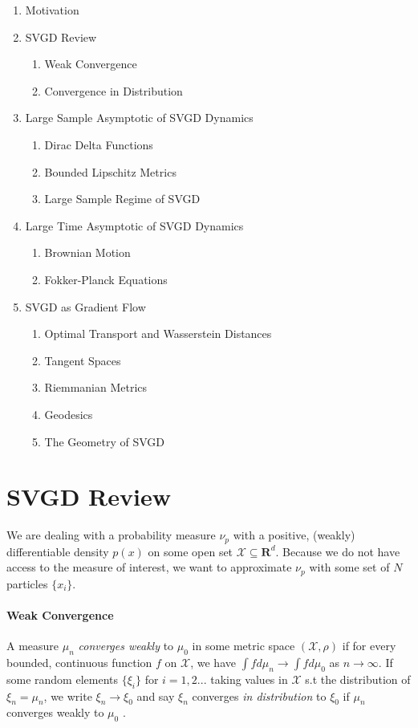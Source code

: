 \documentclass[12pt]{article}
\begin{document}
\begin{enumerate}
    \item Motivation
    \item SVGD Review
    \begin{enumerate}
        \item Weak Convergence
        \item Convergence in Distribution
    \end{enumerate}
    \item Large Sample Asymptotic of SVGD Dynamics
    \begin{enumerate}
        \item Dirac Delta Functions
        \item Bounded Lipschitz Metrics
        \item Large Sample Regime of SVGD
    \end{enumerate}
    \item Large Time Asymptotic of SVGD Dynamics
    \begin{enumerate}
        \item Brownian Motion
        \item Fokker-Planck Equations
    \end{enumerate}
    \item SVGD as Gradient Flow
    \begin{enumerate}
        \item Optimal Transport and Wasserstein Distances
        \item Tangent Spaces
        \item Riemmanian Metrics
        \item Geodesics
        \item The Geometry of SVGD
    \end{enumerate}
\end{enumerate}

\section{SVGD Review}

We are dealing with a probability measure $\nu_p$ with a positive, (weakly) differentiable density $p(x)$ on some open set $\mathcal{X} \subseteq \mathbf{R}^d$. Because we do not have access to the measure of interest, we want to approximate $\nu_p$ with some set of $N$ particles $\{ x_i \}$. 

\paragraph{Weak Convergence} A measure $\mu_n$ \textit{converges weakly} to $\mu_0$ in some metric space $(\mathcal{X}, \rho)$ if for every bounded, continuous function $f$ on $\mathcal{X}$, we have $\int f d\mu_n \rightarrow \int f d\mu_0$ as $n \rightarrow \infty$. If some random elements $\{\xi_i\}$ for $i = 1, 2 ...$ taking values in $\mathcal{X}$ s.t the distribution of $\xi_n = \mu_n$, we write $\xi_n \rightarrow \xi_0$ and say $\xi_n$ converges \textit{in distribution} to $\xi_0$ if $\mu_n$ converges weakly to $\mu_0$ \cite{encycloweakconvergence}.
\end{document}
